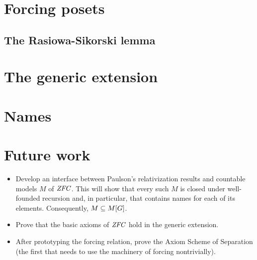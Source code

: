 \documentclass[9pt]{entcs} \usepackage{entcsmacro}
\begin{document}
\section{Forcing posets}\label{sec:forcing-posets}

\subsection{The Rasiowa-Sikorski lemma}


\section{The generic extension}


\section{Names}


\section{Future work}
\begin{itemize}
\item Develop an interface between Paulson's relativization results
  and countable models $M$ of $\mathit{ZFC}$. This will show
  that every such $M$ is closed under well-founded recursion and, in
  particular, that contains names for each of its
  elements. Consequently, $M\subseteq M[G]$.
\item Prove that the basic axioms of $\mathit{ZFC}$ hold in the generic
  extension. 
\item After prototyping the forcing relation, prove the Axiom Scheme
  of Separation (the first that needs to use the machinery of forcing
  nontrivially).
\end{itemize}
\end{document}
